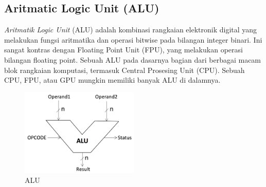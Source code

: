 \subsection{Aritmatic Logic Unit (ALU)}
\textit{Aritmatik Logic Unit} (ALU) adalah kombinasi rangkaian elektronik digital yang melakukan fungsi aritmatika dan operasi bitwise pada bilangan integer binari. Ini sangat kontras dengan Floating Point Unit (FPU), yang melakukan operasi bilangan floating point. Sebuah ALU pada dasarnya bagian dari berbagai macam blok rangkaian komputasi, termasuk Central Prosesing Unit (CPU). Sebuah CPU, FPU, atau GPU mungkin memiliki banyak ALU di dalamnya.

\begin{figure}
	\centering
	\includegraphics[width=0.5\textwidth]
	{pics/alu.png}
	\caption{ALU}
	\label{alu}
\end{figure}

